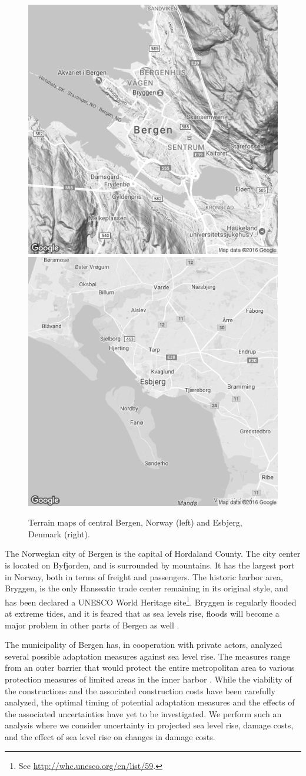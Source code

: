 \documentclass[note,screen,british,11pt]{nrdoc}
\begin{document}
\begin{figure}[!hbpt]
\begin{center}
  \includegraphics[width=0.45\linewidth]{BergenMap.png}
  \includegraphics[width=0.45\linewidth]{EsbjergMap.png}
\caption{Terrain maps of central Bergen, Norway (left) and Esbjerg, Denmark (right).}
\label{fig:CityMaps}
\end{center}
\end{figure}

The Norwegian city of Bergen is the capital of Hordaland County. The city center is located on Byfjorden, and is surrounded by mountains. It has the largest port in Norway, both in terms of freight and passengers. The historic harbor area, Bryggen, is the only Hanseatic trade center remaining in its original style, and has been declared a UNESCO World Heritage site\footnote{See \url{http://whc.unesco.org/en/list/59}.}. Bryggen is regularly flooded at extreme tides, and it is feared that as sea levels rise, floods will become a major problem in other parts of Bergen as well \citep{bergenreport}.

The municipality of Bergen has, in cooperation with private actors, analyzed several possible adaptation measures against sea level rise. The measures range from an outer barrier that would protect the entire metropolitan area to various protection measures of limited areas in the inner harbor \citep{bergenreport}. While the viability of the constructions and the associated construction costs have been carefully analyzed, the optimal timing of potential adaptation measures and the effects of the associated uncertainties have yet to be investigated. We perform such an analysis where we consider uncertainty in projected sea level rise, damage costs, and the effect of sea level rise on changes in damage costs. 
\end{document}
